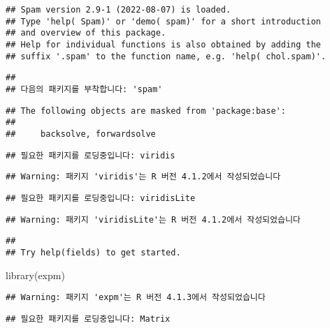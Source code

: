 \documentclass[
]{article}
\newenvironment{Shaded}{\begin{snugshade}}{\end{snugshade}}
\newcommand{\FunctionTok}[1]{\textcolor[rgb]{0.00,0.00,0.00}{#1}}
\newcommand{\NormalTok}[1]{#1}
\begin{document}
\begin{verbatim}
## Spam version 2.9-1 (2022-08-07) is loaded.
## Type 'help( Spam)' or 'demo( spam)' for a short introduction 
## and overview of this package.
## Help for individual functions is also obtained by adding the
## suffix '.spam' to the function name, e.g. 'help( chol.spam)'.
\end{verbatim}

\begin{verbatim}
## 
## 다음의 패키지를 부착합니다: 'spam'
\end{verbatim}

\begin{verbatim}
## The following objects are masked from 'package:base':
## 
##     backsolve, forwardsolve
\end{verbatim}

\begin{verbatim}
## 필요한 패키지를 로딩중입니다: viridis
\end{verbatim}

\begin{verbatim}
## Warning: 패키지 'viridis'는 R 버전 4.1.2에서 작성되었습니다
\end{verbatim}

\begin{verbatim}
## 필요한 패키지를 로딩중입니다: viridisLite
\end{verbatim}

\begin{verbatim}
## Warning: 패키지 'viridisLite'는 R 버전 4.1.2에서 작성되었습니다
\end{verbatim}

\begin{verbatim}
## 
## Try help(fields) to get started.
\end{verbatim}

\begin{Shaded}
\begin{Highlighting}[]
\FunctionTok{library}\NormalTok{(expm)}
\end{Highlighting}
\end{Shaded}

\begin{verbatim}
## Warning: 패키지 'expm'는 R 버전 4.1.3에서 작성되었습니다
\end{verbatim}

\begin{verbatim}
## 필요한 패키지를 로딩중입니다: Matrix
\end{verbatim}
\end{document}
